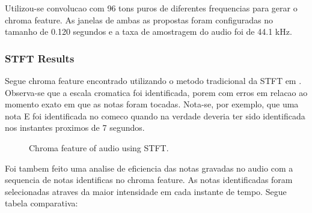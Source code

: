 \documentclass{article}
\begin{document}
	Utilizou-se convolucao com 96 tons puros de diferentes frequencias para gerar o chroma feature. As janelas de ambas as propostas foram configuradas no tamanho de 0.120 segundos e a taxa de amostragem do audio foi de 44.1 kHz.

	\subsubsection{STFT Results}
	Segue chroma feature encontrado utilizando o metodo tradicional da STFT em . Observa-se que a escala cromatica foi identificada, porem com erros em relacao ao momento exato em que as notas foram tocadas. Nota-se, por exemplo, que uma nota E foi identificada no comeco quando na verdade deveria ter sido identificada nos instantes proximos de 7 segundos.

	
	\begin{figure}[h]
	 \centerline{}
	 \caption{Chroma feature of audio using STFT.}
	 \label{fig:1-ssft}
	\end{figure}	

	\newpage
	Foi tambem feito uma analise de eficiencia das notas gravadas no audio com a sequencia de notas identificas no chroma feature. As notas identificadas foram selecionadas atraves da maior intensidade em cada instante de tempo. Segue tabela comparativa:
\end{document}
